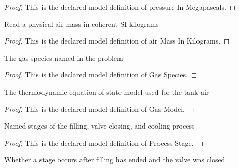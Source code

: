 \begin{proof}
  This is the declared model definition of pressure In Megapascals.
\end{proof}
\begin{definition}
  \label{def:physics:phyx-mini-0443:phyxminiproblems-problemphyxmini0443-airmassinkilograms}
  Read a physical air mass in coherent SI kilograms
\end{definition}
\begin{proof}
  This is the declared model definition of air Mass In Kilograms.
\end{proof}
\begin{definition}
  \label{def:physics:phyx-mini-0443:phyxminiproblems-problemphyxmini0443-gasspecies}
  The gas species named in the problem
\end{definition}
\begin{proof}
  This is the declared model definition of Gas Species.
\end{proof}
\begin{definition}
  \label{def:physics:phyx-mini-0443:phyxminiproblems-problemphyxmini0443-gasmodel}
  The thermodynamic equation-of-state model used for the tank air
\end{definition}
\begin{proof}
  This is the declared model definition of Gas Model.
\end{proof}
\begin{definition}
  \label{def:physics:phyx-mini-0443:phyxminiproblems-problemphyxmini0443-processstage}
  Named stages of the filling, valve-closing, and cooling process
\end{definition}
\begin{proof}
  This is the declared model definition of Process Stage.
\end{proof}
\begin{definition}
  \label{def:physics:phyx-mini-0443:phyxminiproblems-problemphyxmini0443-ispostclosurestage}
  Whether a stage occurs after filling has ended and the valve was closed
\end{definition}

